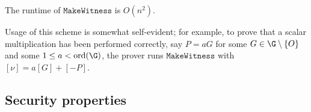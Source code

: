 \documentclass[11pt,letterpaper]{article}
\theoremstyle{definition}
\newcommand{\6}{\mathbf}
\newcommand{\7}{\mathcal}
\begin{document}

The runtime of $\texttt{MakeWitness}$ is $O(n^2)$.


Usage of this scheme is somewhat self-evident; for example, to prove that a scalar multiplication has been performed correctly, say $P = aG$ for some $G \in \G \setminus\left\{O\right\}$ and some $1 \leq a < \text{ord}(\G)$, the prover runs $\texttt{MakeWitness}$ with $[\nu] = a[G] + [-P]$.

\subsection{Security properties}\label{sec:SecurityProps}
\end{document}
